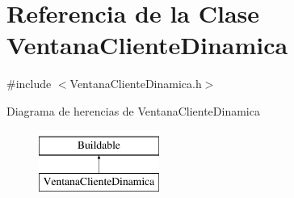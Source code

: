 \hypertarget{classVentanaClienteDinamica}{\section{\-Referencia de la \-Clase \-Ventana\-Cliente\-Dinamica}
\label{classVentanaClienteDinamica}
}


{\ttfamily \#include $<$\-Ventana\-Cliente\-Dinamica.\-h$>$}

\-Diagrama de herencias de \-Ventana\-Cliente\-Dinamica\begin{figure}[H]
\begin{center}
\leavevmode
\includegraphics[height=2.000000cm]{classVentanaClienteDinamica}
\end{center}
\end{figure}
